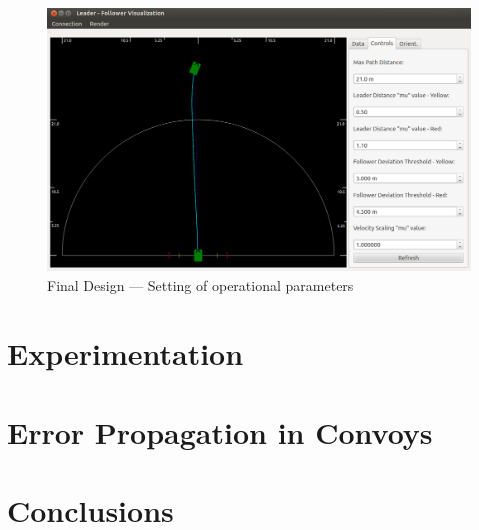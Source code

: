 \documentclass[12pt]{report}
\begin{document}
\begin{figure}[htbp]
    \centering
    \includegraphics[width=6.5in]{./figs/final_design_opts.png}
    \caption{Final Design --- Setting of operational parameters }
    \label{fig:finaldesopts}
\end{figure}


\chapter{Experimentation}
\label{chap:exper}


\chapter{Error Propagation in Convoys}
\label{chap:errprop}


\chapter{Conclusions}





\nocite{travisdiss}
\nocite{travisshort}

\end{document}
